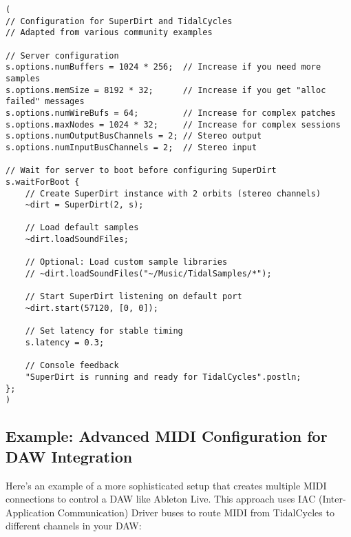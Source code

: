 \documentclass[11pt,a4paper]{article}
\begin{document}
\begin{lstlisting}[style=supercollider]
(
// Configuration for SuperDirt and TidalCycles
// Adapted from various community examples

// Server configuration
s.options.numBuffers = 1024 * 256;  // Increase if you need more samples
s.options.memSize = 8192 * 32;      // Increase if you get "alloc failed" messages
s.options.numWireBufs = 64;         // Increase for complex patches
s.options.maxNodes = 1024 * 32;     // Increase for complex sessions
s.options.numOutputBusChannels = 2; // Stereo output
s.options.numInputBusChannels = 2;  // Stereo input

// Wait for server to boot before configuring SuperDirt
s.waitForBoot {
    // Create SuperDirt instance with 2 orbits (stereo channels)
    ~dirt = SuperDirt(2, s);
    
    // Load default samples
    ~dirt.loadSoundFiles;
    
    // Optional: Load custom sample libraries
    // ~dirt.loadSoundFiles("~/Music/TidalSamples/*");
    
    // Start SuperDirt listening on default port
    ~dirt.start(57120, [0, 0]);
    
    // Set latency for stable timing
    s.latency = 0.3;
    
    // Console feedback
    "SuperDirt is running and ready for TidalCycles".postln;
};
)
\end{lstlisting}

\subsection{Example: Advanced MIDI Configuration for DAW Integration}

Here's an example of a more sophisticated setup that creates multiple MIDI connections to control a DAW like Ableton Live. This approach uses IAC (Inter-Application Communication) Driver buses to route MIDI from TidalCycles to different channels in your DAW:
\end{document}
